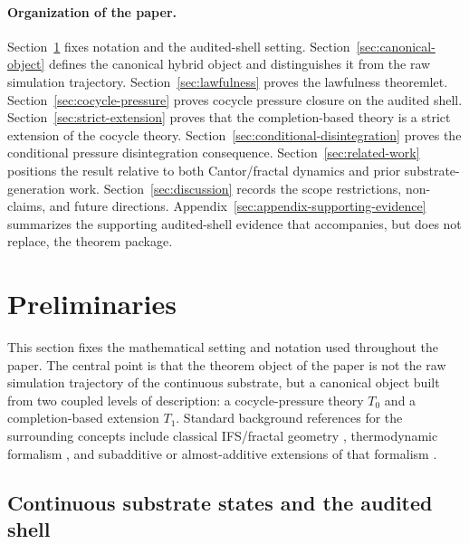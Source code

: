 \documentclass[11pt]{article}
\theoremstyle{definition}
\newcommand{\Tzero}{T_0}
\newcommand{\Tone}{T_1}
\begin{document}
\paragraph{Organization of the paper.}
Section~\ref{sec:preliminaries} fixes notation and the audited-shell setting. Section~\ref{sec:canonical-object} defines the canonical hybrid object and distinguishes it from the raw simulation trajectory. Section~\ref{sec:lawfulness} proves the lawfulness theoremlet. Section~\ref{sec:cocycle-pressure} proves cocycle pressure closure on the audited shell. Section~\ref{sec:strict-extension} proves that the completion-based theory is a strict extension of the cocycle theory. Section~\ref{sec:conditional-disintegration} proves the conditional pressure disintegration consequence. Section~\ref{sec:related-work} positions the result relative to both Cantor/fractal dynamics and prior substrate-generation work. Section~\ref{sec:discussion} records the scope restrictions, non-claims, and future directions. Appendix~\ref{sec:appendix-supporting-evidence} summarizes the supporting audited-shell evidence that accompanies, but does not replace, the theorem package.
 \section{Preliminaries}\label{sec:preliminaries}

This section fixes the mathematical setting and notation used throughout the paper. The central point is that the theorem object of the paper is not the raw simulation trajectory of the continuous substrate, but a canonical object built from two coupled levels of description: a cocycle-pressure theory \(\Tzero\) and a completion-based extension \(\Tone\). Standard background references for the surrounding concepts include classical IFS/fractal geometry \cite{Hutchinson1981Fractals,FalconerFractalGeometry,MauldinUrbanskiGDMS,Moran1946AdditiveFunctions}, thermodynamic formalism \cite{Ruelle1978ThermodynamicFormalism,WaltersErgodic1982,BarreiraNonadditiveTF}, and subadditive or almost-additive extensions of that formalism \cite{CaoFengHuang2008SubAdditive,Mummert2006AlmostAdditive}.

\subsection{Continuous substrate states and the audited shell}
\end{document}
